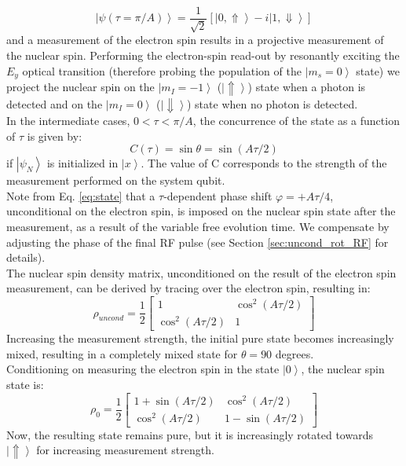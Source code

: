 \documentclass[12pt]{article}
\def\ket#1{\left|#1\right>}
\begin{document}
\begin{equation}
\left| \psi (\tau=\pi/A) \right \rangle = \frac{1}{\sqrt{2}} \left[ \left| 0, \Uparrow \right \rangle -i \left| 1, \Downarrow \right \rangle \right]
\end{equation}
and a measurement of the electron spin results in a projective measurement of the nuclear spin. Performing the electron-spin read-out by resonantly exciting the $E_y$ optical transition (therefore probing the population of the $\left| m_s=0 \right \rangle$ state) we project the nuclear spin on the $\left| m_I = -1 \right \rangle$ ($\ket{\Uparrow}$) state when a photon is detected and on the $\left| m_I = 0 \right \rangle$ ($\ket{\Downarrow}$) state when no photon is detected.\\
In the intermediate cases, $0<\tau<\pi/A$, the concurrence of the state as a function of $\tau$ is given by:
\begin{equation}
 C (\tau) = \sin\theta=\sin \left( A \tau/2 \right) 
\label{eq:concurrence}
\end{equation}
if $\ket{\psi_N}$ is initialized in $\ket{x}$. The value of C corresponds to the strength of the measurement performed on the system qubit.\\
Note from Eq. \ref{eq:state} that a $\tau$-dependent phase shift $\varphi = + A \tau/4$, unconditional on the electron spin, is imposed on the nuclear spin state after the measurement, as a result of the variable free evolution time. We compensate by adjusting the phase of the final RF pulse (see Section \ref{sec:uncond_rot_RF} for details).\\
The nuclear spin density matrix, unconditioned on the result of the electron spin measurement, can be derived by tracing over the electron spin, resulting in:
\begin{equation}
 \rho_{uncond} = \frac{1}{2}
 \left[
\begin{array}{cc}
1 & \cos^2 ( A \tau/2)\\
\cos^2 ( A \tau/2) & 1
 \end{array}
 \right]
\label{eq:uncondRho}
 \end{equation}
Increasing the measurement strength, the initial pure state becomes increasingly mixed, resulting in a completely mixed state for $\theta = 90$ degrees.\\
 Conditioning on measuring the electron spin in the state $\ket{0}$, the nuclear spin state is:
\begin{equation}
 \rho_0 = \frac{1}{2}
 \left[
\begin{array}{cc}
1+\sin ( A \tau/2) & \cos^2 ( A \tau/2)\\
\cos^2 ( A \tau/2) & 1-\sin(A \tau/2)
 \end{array}
 \right]
 \label{eq:condRho}
\end{equation}
Now, the resulting state remains pure, but it is increasingly rotated towards $\ket{\Uparrow}$ for increasing measurement strength. 
\end{document}
